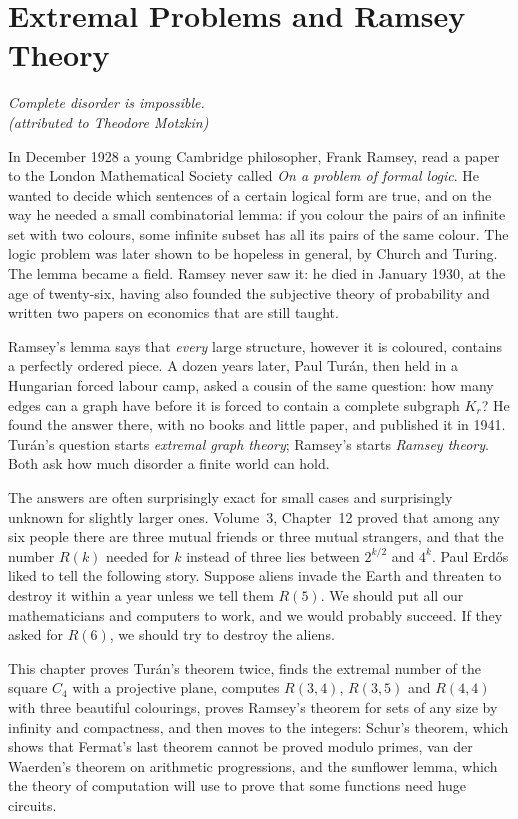 \chapter{Extremal Problems and Ramsey Theory}

\begin{center}\itshape
Complete disorder is impossible.\\
\upshape(attributed to Theodore Motzkin)
\end{center}

In December 1928 a young Cambridge philosopher, Frank Ramsey, read a paper to the London Mathematical Society called
\emph{On a problem of formal logic}. He wanted to decide which sentences of a certain logical form are true, and on the way
he needed a small combinatorial lemma: if you colour the pairs of an infinite set with two colours, some infinite subset has
all its pairs of the same colour. The logic problem was later shown to be hopeless in general, by Church and Turing. The lemma
became a field. Ramsey never saw it: he died in January 1930, at the age of twenty-six, having also founded the subjective theory of
probability and written two papers on economics that are still taught.

Ramsey's lemma says that \emph{every} large structure, however it is coloured, contains a perfectly ordered piece. A dozen years later,
Paul Tur\'an, then held in a Hungarian forced labour camp, asked a cousin of the same question: how many edges can a graph
have before it is forced to contain a complete subgraph $K_r$? He found the answer there, with no books and little paper, and published it in 1941. Tur\'an's question starts \emph{extremal graph theory}; Ramsey's starts \emph{Ramsey
theory}. Both ask how much disorder a finite world can hold.

The answers are often surprisingly exact for small cases and surprisingly unknown for slightly larger ones. Volume~3, Chapter~12
proved that among any six people there are three mutual friends or three mutual strangers, and that the number $R(k)$ needed for $k$
instead of three lies between $2^{k/2}$ and $4^k$. Paul Erd\H os liked to tell the following story. Suppose aliens invade the Earth and
threaten to destroy it within a year unless we tell them $R(5)$. We should put all our mathematicians and computers to work, and we would
probably succeed. If they asked for $R(6)$, we should try to destroy the aliens.

This chapter proves Tur\'an's theorem twice, finds the extremal number of the square $C_4$ with a projective plane, computes
$R(3,4)$, $R(3,5)$ and $R(4,4)$ with three beautiful colourings, proves Ramsey's theorem for sets of any size by infinity and
compactness, and then moves to the integers: Schur's theorem, which shows that Fermat's last theorem cannot be proved modulo
primes, van der Waerden's theorem on arithmetic progressions, and the sunflower lemma, which the theory of computation will use to
prove that some functions need huge circuits.

